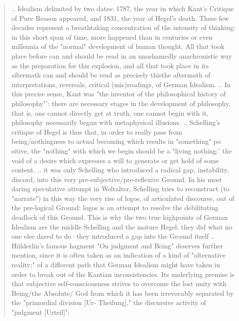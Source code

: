 \documentclass[10pt]{book}
\begin{document}
\begin{quotation}
..
Idealism delimited by two dates: 1787, the year in which Kant's Critique of Pure Reason appeared, and 1831, the year of Hegel's death. These few decades repre­sent a breathtaking concentration of the intensity of thinking: in this short span of time, more happened than in centuries or even millennia of the "normal" development of human thought. All that took place before can and should be read in an unashamedly anachronistic way as the preparation for this explosion, and all that took place in its aftermath can and should be read as precisely this­the aftermath of interpretations, reversals, critical (mis)readings, of German Idealism.
..
In this precise sense, Kant was "the inventor of the philosophical history of philosophy"': there are necessary stages in the development of philosophy, that is, one cannot directly get at truth, one cannot begin with it, philosophy necessarily began with metaphysical illusions.
..
Schelling's critique of Hegel is thus that, in order to really pass from being/nothingness to actual becoming which results in "something" po sitive, the "nothing" with which we begin should be a "living nothing:' the void of a desire which expresses a will to generate or get hold of some content.
..
it was only Schelling who introduced a radical gap, instability, discord, into this very pre-subjective/pre-reflexive Ground. In his most daring speculative attempt in Weltalter, Schelling tries to reconstruct (to "narrate") in this way the very rise of logos, of articulated discourse, out of the pre-logical Ground: logos is an attempt to resolve the debilitating deadlock of this Ground. This is why the two true highpoints of German Idealism are the middle Schelling and the mature Hegel: they did what no one else dared to do·­they introduced a gap into the Ground itself
..
Hiilderlin's famous hagment "On judgment and Being" deserves further mention, since it is often taken as an indication of a kind of "alternative reality;" of a different path that German Idealism might have taken in order to break out of the Kantian inconsistencies. Its underlying premise is that subjective self-consciousness strives to overcome the lost unity with Being/the Absolute/ God from which it has been irrevocably separated by the "primordial division [Ur- Theilung]," the discursive activity of "judgment [Urteil]":


\end{quotation}
\end{document}
